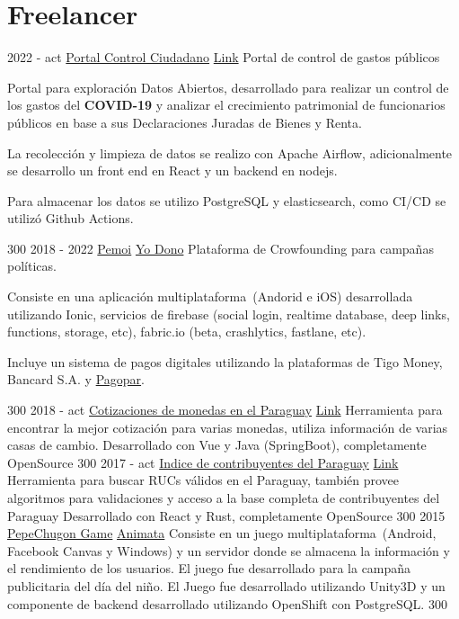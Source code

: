 \documentclass[]{friggeri-cv}
\begin{document}
\section{Freelancer}
\proyectof
    {2022 - act}
    {\href{https://github.com/InstIDEA/controlciudadano}{Portal Control Ciudadano}}
    {\href{https://www.controlciudadanopy.org/}{Link}}
    {Portal de control de gastos públicos}
    {Portal para exploración Datos Abiertos, desarrollado para
        realizar un control de los gastos del \textbf{COVID-19} y analizar el 
        crecimiento patrimonial de funcionarios públicos en base a sus 
        Declaraciones Juradas de Bienes y Renta.

        La recolección y limpieza de datos se realizo con Apache Airflow,
        adicionalmente se desarrollo un front end en React y un backend 
        en nodejs. 
        
        Para almacenar los datos se utilizo PostgreSQL y elasticsearch, como CI/CD 
        se utilizó Github Actions.
     }
    {300}
\proyectof
    {2018 - 2022}
    {\href{https://www.pemoi.com.py}{Pemoi}}
    {\href{https://www.pemoi.com.py/}{Yo Dono}}
    {Plataforma de Crowfounding para campañas políticas.}
    {Consiste en una aplicación multiplataforma~(Andorid e iOS) desarrollada utilizando
     Ionic, servicios de firebase (social login, realtime database, deep links, functions, 
     storage, etc), fabric.io (beta, crashlytics, fastlane, etc).
     
     Incluye un sistema de pagos digitales utilizando la plataformas de
     Tigo Money, Bancard S.A. y \href{https://www.pagopar.com.py}{Pagopar}.
     
     }
    {300}
\proyectof
    {2018 - act}
    {\href{http://github.com/avolpe/cotizacion}{Cotizaciones de monedas en el Paraguay}}
    {\href{https://cotizaciones.volpe.com.py}{Link}}
    {Herramienta para encontrar la mejor cotización para varias monedas,
    utiliza información de varias casas de cambio.}
    {Desarrollado con Vue y Java (SpringBoot), completamente OpenSource}
    {300}
\proyectof
    {2017 - act}
    {\href{http://github.com/avolpe/set-ruc-finder}{Indice de contribuyentes del Paraguay}}
    {\href{https://set.volpe.com.py}{Link}}
    {Herramienta para buscar RUCs válidos en el Paraguay, también provee algoritmos
    para validaciones y acceso a la base completa de contribuyentes del Paraguay}
    {Desarrollado con React y Rust, completamente OpenSource}
    {300}
\proyectof
    {2015}
    {\href{https://apps.facebook.com/pechugon_pepe}{PepeChugon Game}}
    {\href{http://www.animata.com.py/}{Animata}}
    {Consiste en un juego multiplataforma~(Android, Facebook Canvas y Windows)
        y un servidor donde se almacena la información y el rendimiento de los
        usuarios. El juego fue desarrollado para la campaña publicitaria del día
        del niño.}
    {El Juego fue desarrollado utilizando Unity3D y un componente de backend 
    desarrollado utilizando OpenShift con PostgreSQL.}
    {300}
        
\end{document}
